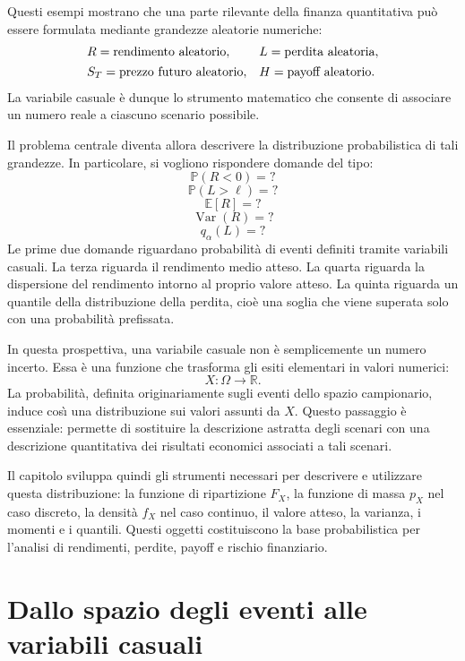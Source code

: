 Questi esempi mostrano che una parte rilevante della finanza quantitativa
pu\`{o} essere formulata mediante grandezze aleatorie numeriche:
\[%
\begin{array}
[c]{ll}%
R=\mbox{rendimento aleatorio}, & L=\mbox{perdita aleatoria},\\[4pt]%
S_{T}=\mbox{prezzo futuro aleatorio}, & H=\mbox{payoff aleatorio}.
\end{array}
\]
La variabile casuale \`{e} dunque lo strumento matematico che consente di
associare un numero reale a ciascuno scenario possibile.

Il problema centrale diventa allora descrivere la distribuzione probabilistica
di tali grandezze. In particolare, si vogliono rispondere domande del tipo:
\[
\mathbb{P}(R<0)=?
\]
\[
\mathbb{P}(L>\ell)=?
\]
\[
\mathbb{E}[R]=?
\]
\[
\operatorname{Var}(R)=?
\]
\[
q_{\alpha}(L)=?
\]
Le prime due domande riguardano probabilit\`{a} di eventi definiti tramite
variabili casuali. La terza riguarda il rendimento medio atteso. La quarta
riguarda la dispersione del rendimento intorno al proprio valore atteso. La
quinta riguarda un quantile della distribuzione della perdita, cio\`{e} una
soglia che viene superata solo con una probabilit\`{a} prefissata.

In questa prospettiva, una variabile casuale non \`{e} semplicemente un numero
incerto. Essa \`{e} una funzione che trasforma gli esiti elementari in valori
numerici:
\[
X:\Omega\longrightarrow\mathbb{R}.
\]
La probabilit\`{a}, definita originariamente sugli eventi dello spazio
campionario, induce cos\`{\i} una distribuzione sui valori assunti da $X$.
Questo passaggio \`{e} essenziale: permette di sostituire la descrizione
astratta degli scenari con una descrizione quantitativa dei risultati
economici associati a tali scenari.

Il capitolo sviluppa quindi gli strumenti necessari per descrivere e
utilizzare questa distribuzione: la funzione di ripartizione $F_{X}$, la
funzione di massa $p_{X}$ nel caso discreto, la densit\`{a} $f_{X}$ nel caso
continuo, il valore atteso, la varianza, i momenti e i quantili. Questi
oggetti costituiscono la base probabilistica per l'analisi di rendimenti,
perdite, payoff e rischio finanziario.

\section{Dallo spazio degli eventi alle variabili casuali}

\label{sec:cap2-dallo-spazio-eventi-vc}

